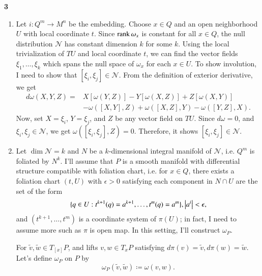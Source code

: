 \documentclass[a4paper, 12pt]{article}
\theoremstyle{Mydefinition}
\theoremstyle{Mytheorem}
\begin{document}
\noindent \textbf{3}
\begin{enumerate}
    \item Let $i:Q^m\rightarrow M^n$ be the embedding. Choose $x\in Q$ and an open neighborhood $U$ with local coordinate $t$. Since $\rank \omega_x$ is constant for all $x\in Q$, the null distribution $\mathcal{N}$ has constant dimension $k$ for some $k$. Using the local trivialization of $TU$ and local coordinate $t$, we can find the vector fields $\xi_1,\ldots, \xi_k$ which spans the null space of $\omega_x$ for each $x\in U$. To show involution, I need to show that $[\xi_i,\xi_j]\in \mathcal{N}$. From the definition of exterior derivative, we get
    \begin{equation*}
        \begin{split}
        d\omega(X,Y,Z) = &X[\omega(Y,Z)] - Y[\omega(X,Z)] + Z[\omega(X,Y)] \\
        &- \omega([X,Y],Z) + \omega([X,Z],Y)-\omega([Y,Z],X).
        \end{split}
    \end{equation*}
    Now, set $X=\xi_i$, $Y=\xi_j$, and $Z$ be any vector field on $TU$. Since $d\omega = 0$, and $\xi_i,\xi_j\in\mathcal{N}$, we get $\omega([\xi_i,\xi_j],Z) = 0$. Therefore, it shows $[\xi_i,\xi_j]\in\mathcal{N}$.
    
    \item Let $\dim \mathcal{N} = k$ and $N$ be a $k$-dimensional integral manifold of $\mathcal{N}$, i.e. $Q^m$ is foliated by $N^k$. I'll assume that $P$ is a smooth manifold with differential structure compatible with foliation chart, i.e. for $x\in Q$, there exists a foliation chart $(t, U)$ with $\epsilon>0$ satisfying each component in $N\cap U$ are the set of the form
    \begin{equation*}
        \{q\in U:t^{k+1}(q)=a^{k+1}, \ldots, t^{m}(q)=a^{m}\},\abs{a^i}<\epsilon,
    \end{equation*}
    and $(t^{k+1}, \ldots, t^{m})$ is a coordinate system of $\pi(U)$; in fact, I need to assume more such as $\pi$ is open map. In this setting, I'll construct $\omega_P$.
    
    For $\tilde{v},\tilde{w}\in T_{[x]}P$, and lifts $v,w\in T_xP$ satisfying $d\pi(v)=\tilde{v},d\pi(w) = \tilde{w}$. Let's define $\omega_P$ on $P$ by
    \begin{equation*}
        \omega_P(\tilde{v},\tilde{w})\coloneqq \omega(v,w).
    \end{equation*}
    

\end{enumerate}
\end{document}
